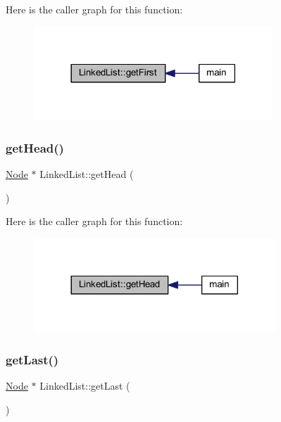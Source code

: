 Here is the caller graph for this function\+:
\nopagebreak
\begin{figure}[H]
\begin{center}
\leavevmode
\includegraphics[width=254pt]{class_linked_list_a744fc291de7eff0b934e7b594449fa10_icgraph}
\end{center}
\end{figure}
\mbox{\label{class_linked_list_a1cba1fc059374f4d263bf5bece9fa136}} 
\subsubsection{\texorpdfstring{get\+Head()}{getHead()}}
{\footnotesize\ttfamily \hyperlink{class_node}{Node} $\ast$ Linked\+List\+::get\+Head (\begin{DoxyParamCaption}{ }\end{DoxyParamCaption})}

Here is the caller graph for this function\+:
\nopagebreak
\begin{figure}[H]
\begin{center}
\leavevmode
\includegraphics[width=257pt]{class_linked_list_a1cba1fc059374f4d263bf5bece9fa136_icgraph}
\end{center}
\end{figure}
\mbox{\label{class_linked_list_ad07d8659b87f77e9fb98a80eb71ed77a}} 
\subsubsection{\texorpdfstring{get\+Last()}{getLast()}}
{\footnotesize\ttfamily \hyperlink{class_node}{Node} $\ast$ Linked\+List\+::get\+Last (\begin{DoxyParamCaption}{ }\end{DoxyParamCaption})}

